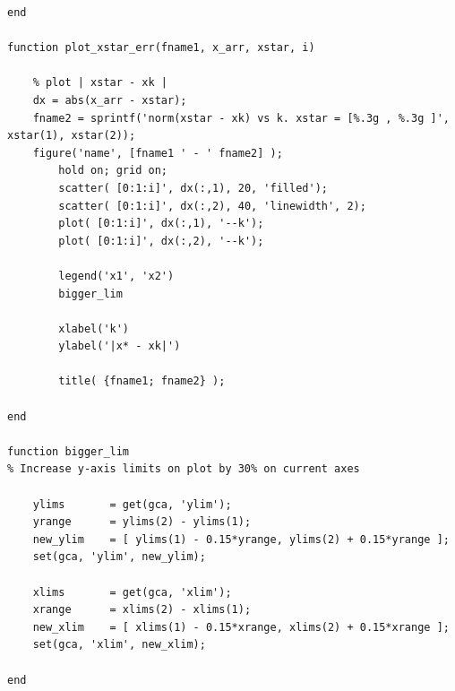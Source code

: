\documentclass[conf]{new-aiaa}
\begin{document}
\begin{lstlisting}
end 

function plot_xstar_err(fname1, x_arr, xstar, i)
	
	% plot | xstar - xk |
	dx = abs(x_arr - xstar); 
	fname2 = sprintf('norm(xstar - xk) vs k. xstar = [%.3g , %.3g ]', xstar(1), xstar(2)); 
	figure('name', [fname1 ' - ' fname2] ); 
		hold on; grid on; 
		scatter( [0:1:i]', dx(:,1), 20, 'filled'); 
		scatter( [0:1:i]', dx(:,2), 40, 'linewidth', 2); 
		plot( [0:1:i]', dx(:,1), '--k');         
		plot( [0:1:i]', dx(:,2), '--k'); 
		
		legend('x1', 'x2')
		bigger_lim 
		
		xlabel('k')
		ylabel('|x* - xk|') 
		
		title( {fname1; fname2} ); 

end 

function bigger_lim
% Increase y-axis limits on plot by 30% on current axes 

	ylims       = get(gca, 'ylim'); 
	yrange      = ylims(2) - ylims(1);
	new_ylim    = [ ylims(1) - 0.15*yrange, ylims(2) + 0.15*yrange ]; 
	set(gca, 'ylim', new_ylim);
	
	xlims       = get(gca, 'xlim'); 
	xrange      = xlims(2) - xlims(1); 
	new_xlim    = [ xlims(1) - 0.15*xrange, xlims(2) + 0.15*xrange ]; 
	set(gca, 'xlim', new_xlim); 

end
\end{lstlisting}






% 
\end{document}
